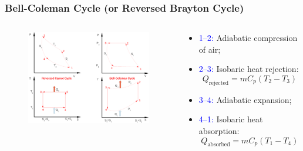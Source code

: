 \documentclass[10pt,compress]{beamer}
\begin{document}
\begin{frame}
 \frametitle{Bell-Coleman Cycle (or Reversed Brayton Cycle)}
  \begin{columns}

   \begin{column}[c]{0.55\linewidth}
    \begin{figure}%
     \begin{center}
      \includegraphics[width=6.8cm,height=6.cm]{./Pics/Overview_Refrig7}
     \end{center}
    \end{figure}  
   \end{column}  


   \begin{column}[c]{0.45\linewidth}
    \begin{itemize}
     \item <1-> \textcolor{blue}{1--2:} Adiabatic compression of air;
     \item <2-> \textcolor{blue}{2--3:} Isobaric heat rejection:
      \begin{displaymath}
       Q_{\text{rejected}}=mC_{p}\left(T_{2}-T_{3}\right)
      \end{displaymath}
     \item <3-> \textcolor{blue}{3--4:} Adiabatic expansion;
     \item <4-> \textcolor{blue}{4--1:} Isobaric heat absorption:
      \begin{displaymath}
       Q_{\text{absorbed}}=mC_{p}\left(T_{1}-T_{4}\right)
      \end{displaymath}
    \end{itemize}
   \end{column}
  \end{columns}


\end{frame}
\end{document}
